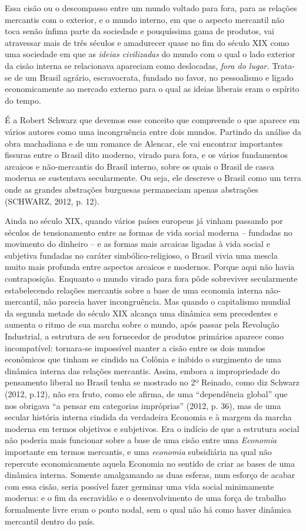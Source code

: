 Essa cisão ou o descompasso entre um mundo voltado para fora, para as
relações mercantis com o exterior, e o mundo interno, em que o aspecto
mercantil não toca senão ínfima parte da sociedade e pouquíssima gama de
produtos, vai atravessar mais de três séculos e amadurecer quase no fim
do século XIX como uma sociedade em que as \emph{ideias civilizadas} do
mundo com o qual o lado exterior da cisão interna se relacionava
apareciam como deslocadas, \emph{fora do lugar.} Trata-se de um Brasil
agrário, escravocrata, fundado no favor, no pessoalismo e ligado
economicamente ao mercado externo para o qual as ideias liberais eram o
espírito do tempo.

É a Robert Schwarz que devemos esse conceito que compreende o que
aparece em vários autores como uma incongruência entre dois mundos.
Partindo da análise da obra machadiana e de um romance de Alencar, ele
vai encontrar importantes fissuras entre o Brasil dito moderno, virado
para fora, e os vários fundamentos arcaicos e não-mercantis do Brasil
interno, sobre os quais o Brasil de casca moderna se sustentava
secularmente. Ou seja, ele descreve o Brasil como um terra onde as
grandes abstrações burguesas permaneciam apenas abstrações (SCHWARZ,
2012, p. 12).

Ainda no século XIX, quando vários países europeus já vinham passando
por séculos de tensionamento entre as formas de vida social moderna --
fundadas no movimento do dinheiro -- e as formas mais arcaicas ligadas à
vida social e subjetiva fundadas no caráter simbólico-religioso, o
Brasil vivia uma mescla muito mais profunda entre aspectos arcaicos e
modernos. Porque aqui não havia contraposição. Enquanto o mundo virado
para fora pôde sobreviver secularmente estabelecendo relações mercantis
sobre a base de uma economia interna não-mercantil, não parecia haver
incongruência. Mas quando o capitalismo mundial da segunda metade do
século XIX alcança uma dinâmica sem precedentes e aumenta o ritmo de sua
marcha sobre o mundo, após passar pela Revolução Industrial, a estrutura
de seu fornecedor de produtos primários aparece como incompatível:
tornara-se impossível manter a cisão entre os dois mundos econômicos que
tinham se cindido na Colônia e inibido o surgimento de uma dinâmica
interna das relações mercantis. Assim, embora a impropriedade do
pensamento liberal no Brasil tenha se mostrado no 2º Reinado, como diz
Schwarz (2012, p.12), não era fruto, como ele afirma, de uma
``dependência global'' que nos obrigava ``a pensar em categorias
impróprias'' (2012, p. 36), mas de uma secular história interna cindida
da verdadeira Economia e à margem da marcha moderna em termos objetivos
e subjetivos. Era o indício de que a estrutura social não poderia mais
funcionar sobre a base de uma cisão entre uma \emph{Economia} importante
em termos mercantis, e uma \emph{economia} subsidiária na qual não
repercute economicamente aquela Economia no sentido de criar as bases de
uma dinâmica interna. Somente amalgamando as duas esferas, num esforço
de acabar com essa cisão, seria possível fazer germinar uma vida social
minimamente moderna: e o fim da escravidão e o desenvolvimento de uma
força de trabalho formalmente livre eram o ponto nodal, sem o qual não
há como haver dinâmica mercantil dentro do país.

